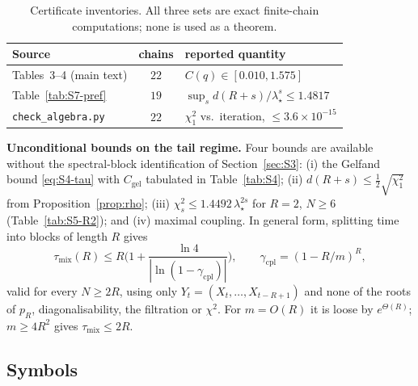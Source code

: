 \documentclass[twoside,11pt]{article}
\begin{document}
\begin{table}[htbp]
\centering
\begin{tabular}{@{}lcl@{}}
\toprule
Source & chains & reported quantity \\
\midrule
Tables~3--4 (main text) & $22$ & $C(q)\in[0.010,1.575]$ \\
Table~\ref{tab:S7-pref} & $19$ & $\sup_s d(R+s)/\lambda_\star^{s}\le1.4817$ \\
\texttt{check\_algebra.py} & $22$ & $\chi^2_1$ vs.\ iteration, $\le3.6\times10^{-15}$ \\
\bottomrule
\end{tabular}
\caption{Certificate inventories. All three sets are exact finite-chain
computations; none is used as a theorem.}
\label{tab:S7-inv}
\end{table}

\textbf{Unconditional bounds on the tail regime.} Four bounds are
available without the spectral-block identification of
Section~\ref{sec:S3}: (i) the Gelfand bound \eqref{eq:S4-tau} with
$C_{\mathrm{gel}}$ tabulated in Table~\ref{tab:S4}; (ii)
$d(R+s)\le\tfrac12\sqrt{\chi^2_1}$ from Proposition~\ref{prop:rho}; (iii)
$\chi^2_s\le1.4492\,\lambda_\star^{2s}$ for $R=2$, $N\ge6$
(Table~\ref{tab:S5-R2}); and (iv) maximal coupling. In general form,
splitting time into blocks of length $R$ gives
\begin{equation}\label{eq:S7-coupling}
\tau_{\mathrm{mix}}(R)\le R\Big(1+\frac{\ln4}{|\ln(1-\gamma_{\mathrm{cpl}})|}\Big),\qquad
\gamma_{\mathrm{cpl}}=(1-R/m)^{R},
\end{equation}
valid for every $N\ge2R$, using only $Y_t=(X_t,\dots,X_{t-R+1})$ and none of
the roots of $p_R$, diagonalisability, the filtration or $\chi^2$. For $m=O(R)$ it is loose by $e^{\Theta(R)}$; $m\ge4R^2$ gives
$\tau_{\mathrm{mix}}\le2R$.

\subsection{Symbols}
\label{sec:S8}
\end{document}
